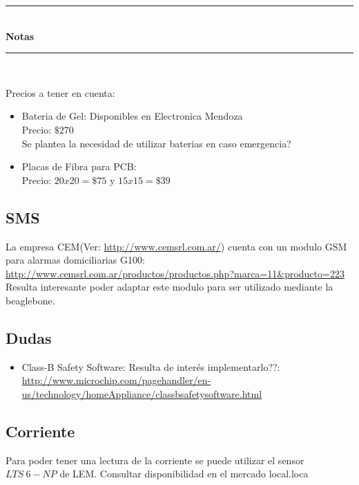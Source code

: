 \documentclass[idxtotoc,hyperref,openany]{labbook} %
\newcommand{\HRule}{\rule{\linewidth}{0.5mm}} %
\begin{document}
%

% 
% 
% 
% 
% 
% 
% 
% 
% 
% 


\labday{} %
\begin{center}
\HRule \\[0.4cm]
{\huge \textbf{Notas}}\\[0.4cm] %
\HRule \\[1.5cm]
\end{center}

Precios a tener en cuenta:
\begin{itemize}
 \item Bateria de Gel: Disponibles en Electronica Mendoza\\
 Precio: $\$270$\\
 Se plantea la necesidad de utilizar baterias en caso emergencia?
 \item Placas de Fibra para PCB:\\
 Precio: $20x20=\$75$ y $15x15=\$39$
\end{itemize}

\subsection{SMS}
La empresa CEM(Ver: \url{http://www.cemsrl.com.ar/}) cuenta con un modulo GSM para 
alarmas domiciliarias G100: \url{http://www.cemsrl.com.ar/productos/productos.php?marca=11&producto=223}\\
Resulta interesante poder adaptar este modulo para ser utilizado mediante la beaglebone.


\subsection{Dudas}
\begin{itemize}
 \item Class-B Safety Software: Resulta de interés implementarlo??: 
 \url{http://www.microchip.com/pagehandler/en-us/technology/homeAppliance/classbsafetysoftware.html}
\end{itemize}

\subsection{Corriente}
Para poder tener una lectura de la corriente se puede utilizar el sensor
$LTS~6-NP$ de LEM. Consultar disponibilidad en el mercado local.loca
\end{document}
